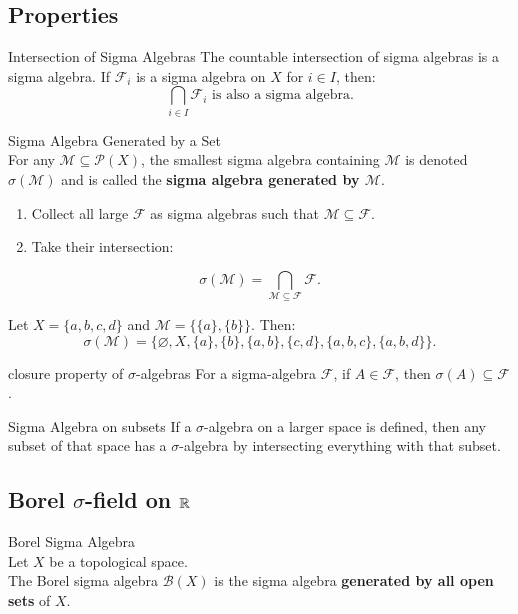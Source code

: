 \subsection{Properties}
\begin{prop}{Intersection of Sigma Algebras}
The countable intersection of sigma algebras is a sigma algebra. If \(\mathscr{F}_i\) is a sigma algebra on \(X\) for \(i \in I\), then:
\[
\bigcap_{i \in I} \mathscr{F}_i \text{ is also a sigma algebra.}
\]
\end{prop}

\begin{df}{Sigma Algebra Generated by a Set}\\
For any \(\mathcal{M} \subseteq \mathscr{P}(X)\), the smallest sigma algebra containing \(\mathcal{M}\) is denoted \(\sigma(\mathcal{M})\) and is called the \textbf{sigma algebra generated by \(\mathcal{M}\)}.
\begin{enumerate}
    \item Collect all large \(\mathscr{F}\) as sigma algebras such that \(\mathcal{M} \subseteq \mathscr{F}\).
    \item Take their intersection:
\end{enumerate}
    \[
    \sigma(\mathcal{M}) = \bigcap_{\mathcal{M} \subseteq \mathscr{F}} \mathscr{F}.
    \]
\end{df}

\begin{eg}{}
Let \(X = \{a, b, c, d\}\) and \(\mathcal{M} = \{\{a\}, \{b\}\}\). Then:
\[
\sigma(\mathcal{M}) = \{\varnothing, X, \{a\}, \{b\}, \{a, b\}, \{c, d\}, \{a, b, c\}, \{a, b, d\}\}.
\]
\end{eg}

\begin{thm}{closure property of $\sigma$-algebras}
	For a sigma-algebra $\mathscr{F}$, if \( A \in \mathscr{F} \), then \(\sigma(A) \subseteq \mathscr{F}\).	
\end{thm}



\begin{prop}{Sigma Algebra on subsets}
\noindent If a $\sigma$-algebra on a larger space is defined, then any subset of that space has a $\sigma$-algebra by intersecting everything with that subset.	
\end{prop}



\subsection{Borel $\sigma$-field on ${\mathbb{R}}$}
\begin{df}{Borel Sigma Algebra}\\
Let \(X\) be a topological space. \\
The Borel sigma algebra \(\mathscr{B}(X)\) is the sigma algebra \textbf{generated by all open sets} of $X$.
\end{df}

